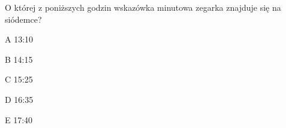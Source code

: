 \begin{tresc}
O której z poniższych godzin wskazówka minutowa zegarka znajduje się na siódemce?
\end{tresc}
\begin{wariant}{A} 13:10 \end{wariant}
\begin{wariant}{B} 14:15 \end{wariant}
\begin{wariant}{C} 15:25 \end{wariant}
\begin{wariant}{D} 16:35 \end{wariant}
\begin{wariant}{E} 17:40 \end{wariant}
